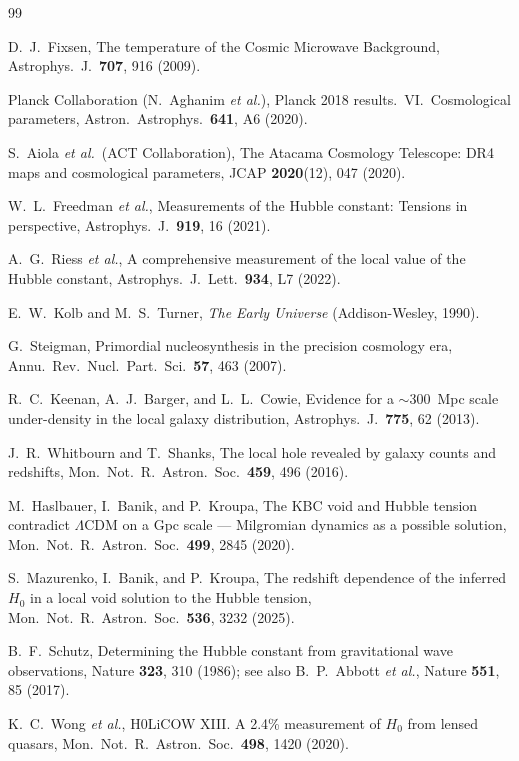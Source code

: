 \documentclass[12pt, a4paper]{article}
\begin{document}
\begin{thebibliography}{99}

D.~J.~Fixsen,
The temperature of the Cosmic Microwave Background,
Astrophys.\ J.\ \textbf{707}, 916 (2009).

Planck Collaboration (N.~Aghanim \emph{et al.}),
Planck 2018 results.\ VI.\ Cosmological parameters,
Astron.\ Astrophys.\ \textbf{641}, A6 (2020).

S.~Aiola \emph{et al.}\ (ACT Collaboration),
The Atacama Cosmology Telescope: DR4 maps and cosmological parameters,
JCAP \textbf{2020}(12), 047 (2020).

W.~L.~Freedman \emph{et al.},
Measurements of the Hubble constant: Tensions in perspective,
Astrophys.\ J.\ \textbf{919}, 16 (2021).

A.~G.~Riess \emph{et al.},
A comprehensive measurement of the local value of the Hubble constant,
Astrophys.\ J.\ Lett.\ \textbf{934}, L7 (2022).

E.~W.~Kolb and M.~S.~Turner,
\emph{The Early Universe} (Addison-Wesley, 1990).

G.~Steigman,
Primordial nucleosynthesis in the precision cosmology era,
Annu.\ Rev.\ Nucl.\ Part.\ Sci.\ \textbf{57}, 463 (2007).

R.~C.~Keenan, A.~J.~Barger, and L.~L.~Cowie,
Evidence for a $\sim$300~Mpc scale under-density in the local galaxy distribution,
Astrophys.\ J.\ \textbf{775}, 62 (2013).

J.~R.~Whitbourn and T.~Shanks,
The local hole revealed by galaxy counts and redshifts,
Mon.\ Not.\ R.\ Astron.\ Soc.\ \textbf{459}, 496 (2016).

M.~Haslbauer, I.~Banik, and P.~Kroupa,
The KBC void and Hubble tension contradict $\Lambda$CDM on a Gpc scale --- Milgromian dynamics as a possible solution,
Mon.\ Not.\ R.\ Astron.\ Soc.\ \textbf{499}, 2845 (2020).

S.~Mazurenko, I.~Banik, and P.~Kroupa,
The redshift dependence of the inferred $H_0$ in a local void solution to the Hubble tension,
Mon.\ Not.\ R.\ Astron.\ Soc.\ \textbf{536}, 3232 (2025).

B.~F.~Schutz,
Determining the Hubble constant from gravitational wave observations,
Nature \textbf{323}, 310 (1986); see also B.~P.~Abbott \emph{et al.}, Nature \textbf{551}, 85 (2017).

K.~C.~Wong \emph{et al.},
H0LiCOW XIII. A 2.4\% measurement of $H_0$ from lensed quasars,
Mon.\ Not.\ R.\ Astron.\ Soc.\ \textbf{498}, 1420 (2020).

\end{thebibliography}
\end{document}

